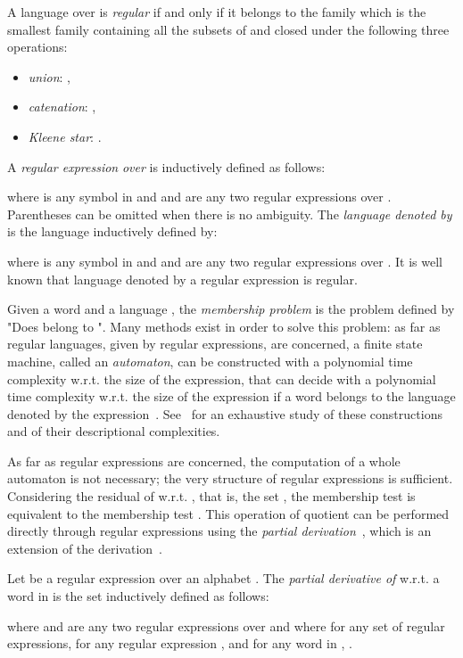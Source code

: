 \documentclass[a4paper]{llncs}
\begin{document}
  A language over  is \emph{regular} if and only if it belongs to the family  which is the smallest family containing all the subsets of  and closed under the following three operations:
  \begin{itemize}
    \item \emph{union}: ,
    \item \emph{catenation}: ,
    \item \emph{Kleene star}: .
  \end{itemize}
  
  A \emph{regular expression}  \emph{over}  is inductively defined as follows:
  
  where  is any symbol in  and  and  are any two regular expressions over . Parentheses can be omitted when there is no ambiguity.  The \emph{language denoted by}  is the language  inductively defined by:
  
  where  is any symbol in  and  and  are any two regular expressions over . It is well known that language denoted by a regular expression is regular.
  
  Given a word  and a language , the \emph{membership problem} is the problem defined by "Does  belong to ". Many methods exist in order to solve this problem: 
as far as regular languages, given by regular expressions, are concerned, a finite state machine, called an \emph{automaton}, can be constructed with a polynomial time complexity w.r.t. the size of the expression, that can decide with a polynomial time complexity w.r.t. the size of the expression if a word  belongs to the language denoted by the expression~\cite{Glu60,IY03,MY60,Tho68}. See~\cite{GH14} for an exhaustive study of these constructions and of their descriptional complexities.
  
  As far as regular expressions are concerned, the computation of a whole automaton is not necessary; the very structure of regular expressions is sufficient. 
Considering the residual  of  w.r.t. , that is, the set
  , the membership test  is equivalent to the membership test . This operation of quotient can be performed directly through regular expressions using the \emph{partial derivation}~\cite{Ant96}, which is an extension of the derivation~\cite{Brz64}.
  
  \begin{definition}
    Let  be a regular expression over an alphabet . The \emph{partial derivative of}  w.r.t. a word  in  is the set  inductively defined as follows:  
  
  where  and  are any two regular expressions over  and where for any set  of regular expressions, for any regular expression ,  and for any word  in , .
  \end{definition}
  
\end{document}
